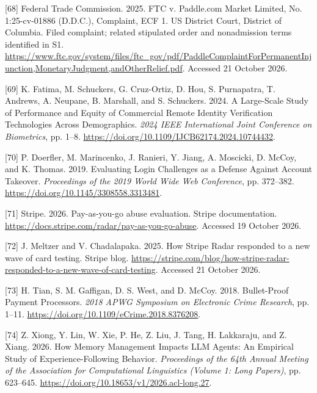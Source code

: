 \documentclass[
  11pt,
]{article}
\newlength{\cslhangindent}
\newlength{\cslentryspacingunit} %
\newenvironment{CSLReferences}[2] %
 {%
  \setlength{\parindent}{0pt}
  \ifodd #1
  \let\oldpar\par
  \def\par{\hangindent=\cslhangindent\oldpar}
  \fi
  \setlength{\parskip}{#2\cslentryspacingunit}
 }%
 {}
\begin{document}
\begin{CSLReferences}{1}{1}
\leavevmode{}%
{[}68{]} Federal Trade Commission. 2025. FTC v. Paddle.com Market
Limited, No. 1:25-cv-01886 (D.D.C.), Complaint, ECF 1. US District
Court, District of Columbia. Filed complaint; related stipulated order
and nonadmission terms identified in S1.
\url{https://www.ftc.gov/system/files/ftc_gov/pdf/PaddleComplaintForPermanentInjunction,MonetaryJudgment,andOtherRelief.pdf}.
Accessed 21 October 2026.

\leavevmode{}%
{[}69{]} K. Fatima, M. Schuckers, G. Cruz-Ortiz, D. Hou, S. Purnapatra,
T. Andrews, A. Neupane, B. Marshall, and S. Schuckers. 2024. A
Large-Scale Study of Performance and Equity of Commercial Remote
Identity Verification Technologies Across Demographics. \emph{2024 IEEE
International Joint Conference on Biometrics}, pp. 1--8.
\url{https://doi.org/10.1109/IJCB62174.2024.10744432}.

\leavevmode{}%
{[}70{]} P. Doerfler, M. Marincenko, J. Ranieri, Y. Jiang, A. Moscicki,
D. McCoy, and K. Thomas. 2019. Evaluating Login Challenges as a Defense
Against Account Takeover. \emph{Proceedings of the 2019 World Wide Web
Conference}, pp. 372--382.
\url{https://doi.org/10.1145/3308558.3313481}.

\leavevmode{}%
{[}71{]} Stripe. 2026. Pay-as-you-go abuse evaluation. Stripe
documentation. \url{https://docs.stripe.com/radar/pay-as-you-go-abuse}.
Accessed 19 October 2026.

\leavevmode{}%
{[}72{]} J. Meltzer and V. Chadalapaka. 2025. How Stripe Radar responded
to a new wave of card testing. Stripe blog.
\url{https://stripe.com/blog/how-stripe-radar-responded-to-a-new-wave-of-card-testing}.
Accessed 21 October 2026.

\leavevmode{}%
{[}73{]} H. Tian, S. M. Gaffigan, D. S. West, and D. McCoy. 2018.
Bullet-Proof Payment Processors. \emph{2018 APWG Symposium on Electronic
Crime Research}, pp. 1--11.
\url{https://doi.org/10.1109/eCrime.2018.8376208}.

\leavevmode{}%
{[}74{]} Z. Xiong, Y. Lin, W. Xie, P. He, Z. Liu, J. Tang, H. Lakkaraju,
and Z. Xiang. 2026. How Memory Management Impacts LLM Agents: An
Empirical Study of Experience-Following Behavior. \emph{Proceedings of
the 64th Annual Meeting of the Association for Computational Linguistics
(Volume 1: Long Papers)}, pp. 623--645.
\url{https://doi.org/10.18653/v1/2026.acl-long.27}.


\end{CSLReferences}
\end{document}
